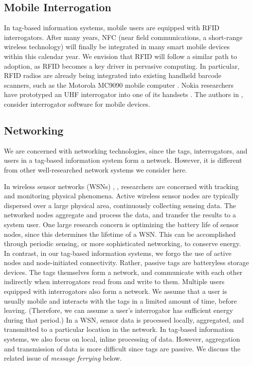 \subsection{Mobile Interrogation}
In tag-based information systems, mobile users are equipped with RFID interrogators. After many years, NFC (near field communications, a short-range wireless technology) will finally be integrated in many smart mobile devices within this calendar year. We envision that RFID will follow a similar path to adoption, as RFID becomes a key driver in pervasive computing. In particular, RFID radios are already being integrated into existing handheld barcode scanners, such as the Motorola MC9090 mobile computer \cite{Motorola}. Nokia researchers have prototyped an UHF interrogator into one of its handsets \cite{2009 Savolainen}. The authors in \cite{2005 Pohjanheimo}, \cite{2008 Loffler} consider interrogator software for mobile devices.

\subsection{Networking}
We are concerned with networking technologies, since the tags, interrogators, and users in a tag-based information system form a network. However, it is different from other well-researched network systems we consider here.

In wireless sensor networks (WSNs) \cite{2005 Akyildiz}, \cite{2008 Yick}, researchers are concerned with tracking and monitoring physical phenomena. Active wireless sensor nodes are typically dispersed over a large physical area, continuously collecting sensing data. The networked nodes aggregate and process the data, and transfer the results to a system user. One large research concern is optimizing the battery life of sensor nodes, since this determines the lifetime of a WSN. This can be accomplished through periodic sensing, or more sophisticated networking, to conserve energy. In contrast, in our tag-based information systems, we forgo the use of active nodes and node-initiated connectivity. Rather, passive tags are batteryless storage devices. The tags themselves form a network, and communicate with each other indirectly when interrogators read from and write to them. Multiple users equipped with interrogators also form a network. We assume that a user is usually mobile and interacts with the tags in a limited amount of time, before leaving. (Therefore, we can assume a user's interrogator has sufficient energy during that period.) In a WSN, sensor data is processed locally, aggregated, and transmitted to a particular location in the network. In tag-based information systems, we also focus on local, inline processing of data. However, aggregation and transmission of data is more difficult since tags are passive. We discuss the related issue of \emph{message ferrying} below. 

